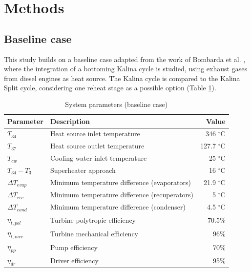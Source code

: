 \documentclass[final,times,3p]{elsarticle}
\begin{document}
\section{Methods}
\label{sec:methods}

\subsection{Baseline case}

This study builds on a baseline case adapted from the work of Bombarda et al. \cite{Bombarda2010b}, where the integration of a bottoming Kalina cycle is studied, using exhaust gases from diesel engines as heat source. The Kalina cycle is compared to the Kalina Split cycle, considering one reheat stage as a possible option (Table \ref{tab:system_baseline}).

\begin{table}[htbp]
\scriptsize
  \centering
  \caption{System parameters (baseline case)}
    \begin{tabular}{llr}
    \toprule
    Parameter & Description  & Value \\
    \midrule
     $T_{34}$ & Heat source inlet temperature & 346 $^{\circ}$C \\
     $T_{37}$     & Heat source outlet temperature & 127.7 $^{\circ}$C\\
     $T_{cw}$    & Cooling water inlet temperature & 25 $^{\circ}$C\\
     $T_{34}-T_{3}$  & Superheater approach & 16 $^{\circ}$C\\
     $\Delta T_{evap}$     & Minimum temperature difference (evaporators) & 21.9 $^{\circ}$C \\
     $\Delta T_{rec}$    & Minimum temperature difference (recuperators) & 5 $^{\circ}$C \\
     $\Delta T_{cond}$   & Minimum temperature difference (condenser) & 4.5 $^{\circ}$C \\
     $\eta_{t,pol}$    & Turbine polytropic efficiency & 70.5$\%$\\
     $\eta_{t,mec}$    & Turbine mechanical efficiency & 96$\%$\\
     $\eta_{pp}$    & Pump efficiency & 70$\%$\\
     $\eta_{dr}$  & Driver efficiency & 95$\%$\\
    \bottomrule
    \end{tabular}%
  \label{tab:system_baseline}%
\end{table}
\end{document}
